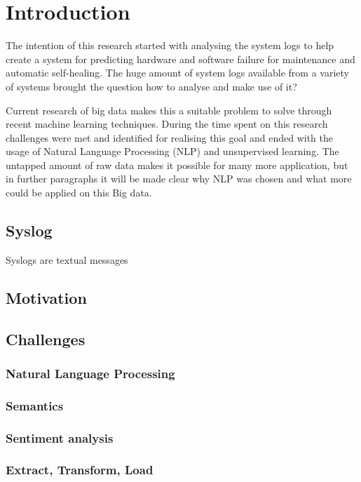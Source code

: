 \chapter{Introduction} \label{ch:introduction}
The intention of this research started with analysing the system logs to help create a system for predicting hardware and software failure for maintenance and automatic self-healing. The huge amount of system logs available from a variety of systems brought the question how to analyse and make use of it? 

Current research of big data makes this a suitable problem to solve through recent machine learning techniques. 
During the time spent on this research challenges were met and identified for realising this goal and ended with the usage of Natural Language Processing (NLP) and unsupervised learning.  The untapped amount of raw data makes it possible for many more application, but in further paragraphs it will be made clear why NLP was chosen and what more could be applied on this Big data. 
 
 
\section{Syslog} 
Syslogs are textual messages \cite{Stearley2004TowardsSyslogs}

\section{Motivation}


\section{Challenges}


\subsection{Natural Language Processing}


\subsection{Semantics}


\subsection{Sentiment analysis}


\subsection{Extract, Transform, Load}


